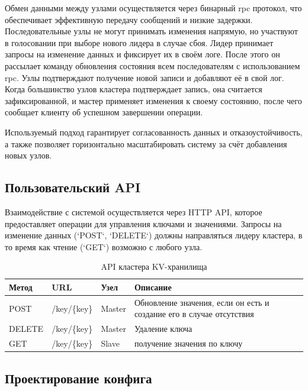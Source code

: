 Обмен данными между узлами осуществляется через бинарный rpc протокол, что обеспечивает
эффективную передачу сообщений и низкие задержки. Последовательные узлы не могут
принимать изменения напрямую, но участвуют в голосовании при выборе нового лидера в
случае сбоя. Лидер принимает запросы на изменение данных и фиксирует их в своём логе.
После этого он рассылает команду обновления состояния всем последователям с
использованием rpc. Узлы подтверждают получение новой записи и добавляют её в свой лог.
Когда большинство узлов кластера подтверждает запись, она считается зафиксированной, и
мастер применяет изменения к своему состоянию, после чего сообщает клиенту об успешном
завершении операции.  

Используемый подход гарантирует согласованность данных и отказоустойчивость, а также
позволяет горизонтально масштабировать систему за счёт добавления новых узлов.

\subsection{Пользовательский API}

Взаимодействие с системой осуществляется через HTTP API, которое предоставляет операции
для управления ключами и значениями. Запросы на изменение данных (`POST`, `DELETE`)
должны направляться лидеру кластера, в то время как чтение (`GET`) возможно с любого
узла.

\begin{table}[h]
    \centering
    \caption{API кластера KV-хранилища}
    \label{tab:tab1}
    \begin{tabular}{|l|l|l|m{10cm}|}\hline
    \textbf{Метод} & \textbf{URL}       & \textbf{Узел} & \textbf{Описание} \\ \hline
    POST            & /key/\{key\}       & Master         & Обновление значения, если он есть и
                                                          создание его в случае отсутствия \\ \hhline{~---}
    DELETE         & /key/\{key\}       & Master         & Удаление ключа   \\ \hhline{----}
    GET           & /key/\{key\}       & Slave        & получение значения по ключу     \\ \hline
    \end{tabular}
\end{table}

\subsection{Проектирование конфига}

